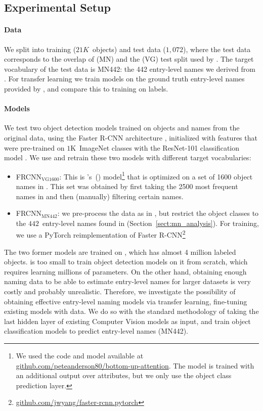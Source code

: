 \subsection{Experimental Setup}
\label{sect:exp_setup}

\paragraph{Data}
We split \mn into training ($21K$~objects) and test data ($1,072$), where the test data corresponds to the overlap of \mn (MN) and the \vg (VG) test split used by  . 
The target vocabulary of the test data is MN442: the 442 entry-level names we derived from \mn. %
For transfer learning we train models on the ground truth entry-level names provided by \mn, and compare this to training on \vg labels. 

\paragraph{Models}
We test two object detection models trained on objects and names from the original \vg data, using the Faster R-CNN architecture \cite{fasterrcnn2015}, initialized with features that were pre-trained on $1$K~ImageNet classes with the ResNet-101 classification model \cite{he2016deep}.
We use and retrain these two models with different target vocabularies:

\begin{itemize}
\item FRCNN$_{\text{VG1600}}$: This is \citeauthor{anderson2018updown}'s~(\citeyear{anderson2018updown}) model\footnote{We used the code and model available at  \url{github.com/peteanderson80/bottom-up-attention}. The model is trained with an additional output over attributes, but we only use the object class prediction layer.} that is optimized on a set of 1600 object names in \vg. This set was obtained by first taking the 2500 most frequent names in \vg and then (manually) filtering certain names.
 \item  FRCNN$_{\text{MN442}}$: we pre-process the \vg data as in \citeauthor{anderson2018updown}, but restrict the object classes to the $442$~entry-level names found in \mn (Section~\ref{sect:mn_analysis}). 
For training, we use a PyTorch reimplementation of Faster R-CNN\footnote{\url{github.com/jwyang/faster-rcnn.pytorch}}
\end{itemize}

The two former models are trained on \vg, which has almost 4 million labeled objects.
\mn is too small to train object detection models on it from scratch, which requires learning millions of parameters.
On the other hand, obtaining enough naming data to be able to estimate entry-level names for larger datasets is very costly and probably unrealistic.
Therefore, we investigate the possibility of obtaining effective entry-level naming models via transfer learning, fine-tuning existing models with \mn data.
We do so with the standard methodology of taking the last hidden layer of existing Computer Vision models as input, and train object classification models to predict entry-level names (MN442).

